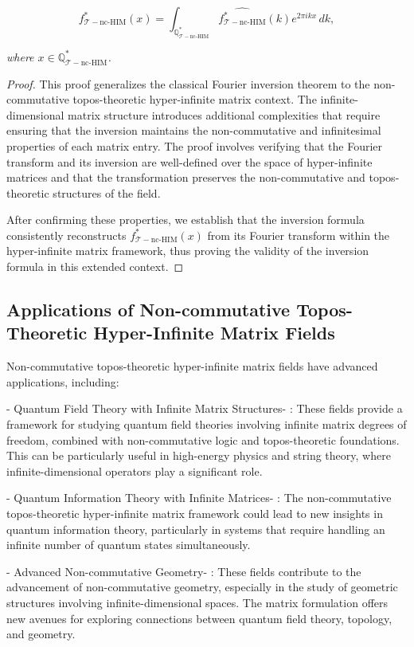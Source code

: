 \documentclass{article}
\begin{document}
\[
f_{\mathcal{T}-\text{nc-HIM}}^*(x) = \int_{\mathbb{Q}_{\mathcal{T}-\text{nc-HIM}}^*} \widehat{f_{\mathcal{T}-\text{nc-HIM}}^*}(k) e^{2\pi i k x} \, dk,
\]

\textit{where \(x \in \mathbb{Q}_{\mathcal{T}-\text{nc-HIM}}^*\).}

\begin{proof}
This proof generalizes the classical Fourier inversion theorem to the non-commutative topos-theoretic hyper-infinite matrix context. The infinite-dimensional matrix structure introduces additional complexities that require ensuring that the inversion maintains the non-commutative and infinitesimal properties of each matrix entry. The proof involves verifying that the Fourier transform and its inversion are well-defined over the space of hyper-infinite matrices and that the transformation preserves the non-commutative and topos-theoretic structures of the field.

After confirming these properties, we establish that the inversion formula consistently reconstructs \(f_{\mathcal{T}-\text{nc-HIM}}^*(x)\) from its Fourier transform within the hyper-infinite matrix framework, thus proving the validity of the inversion formula in this extended context.
\end{proof}

\subsection{Applications of Non-commutative Topos-Theoretic Hyper-Infinite Matrix Fields}
Non-commutative topos-theoretic hyper-infinite matrix fields have advanced applications, including:

-  Quantum Field Theory with Infinite Matrix Structures- : These fields provide a framework for studying quantum field theories involving infinite matrix degrees of freedom, combined with non-commutative logic and topos-theoretic foundations. This can be particularly useful in high-energy physics and string theory, where infinite-dimensional operators play a significant role.

-  Quantum Information Theory with Infinite Matrices- : The non-commutative topos-theoretic hyper-infinite matrix framework could lead to new insights in quantum information theory, particularly in systems that require handling an infinite number of quantum states simultaneously.

-  Advanced Non-commutative Geometry- : These fields contribute to the advancement of non-commutative geometry, especially in the study of geometric structures involving infinite-dimensional spaces. The matrix formulation offers new avenues for exploring connections between quantum field theory, topology, and geometry.
\end{document}
